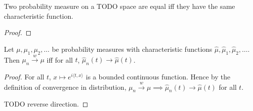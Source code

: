 \begin{lemma}\label{lem:ext_charFun}
Two probability measure on a TODO space are equal iff they have the same characteristic function.
\end{lemma}
\begin{proof}

\end{proof}

\begin{theorem}\label{thm:charFun_tendsto_iff_measure_tendsto}
Let $\mu, \mu_1, \mu_2, \ldots$ be probability measures with characteristic functions $\hat{\mu}, \hat{\mu}_1, \hat{\mu}_2, \ldots$. Then $\mu_n \xrightarrow{w} \mu$ iff for all $t$, $\hat{\mu}_n(t) \to \hat{\mu}(t)$.
\end{theorem}

\begin{proof}
For all $t$, $x \mapsto e^{i \langle t, x \rangle}$ is a bounded continuous function. Hence by the definition of convergence in distribution, $\mu_n \xrightarrow{w} \mu \implies \hat{\mu}_n(t) \to \hat{\mu}(t)$ for all $t$.

TODO reverse direction.
\end{proof}